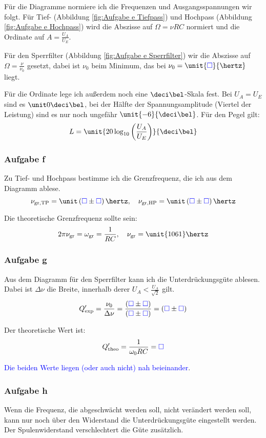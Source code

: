 \documentclass[11pt, ngerman]{article}
\newcommand{\emesswert}{\left(\messwert \pm \messwert \right)}
\newcommand{\messwert}{\textcolor{blue}{\square}}
\begin{document}
Für die Diagramme normiere ich die Frequenzen und Ausgangsspannungen wir folgt.
Für Tief- (Abbildung \ref{fig:Aufgabe e Tiefpass}) und Hochpass (Abbildung
\ref{fig:Aufgabe e Hochpass}) wird die Abszisse auf $\Omega = \nu R C$ normiert
und die Ordinate auf $A = \frac{U_A}{U_E}$.

Für den Sperrfilter (Abbildung \ref{fig:Aufgabe e Sperrfilter}) wir die
Abszisse auf $\Omega = \frac{\nu}{\nu_0}$ gesetzt, dabei ist $\nu_0$ beim
Minimum, das bei $\nu_0 = \unit{\messwert}{\hertz}$ liegt.

Für die Ordinate lege ich außerdem noch eine $\deci\bel$-Skala fest. Bei $U_A =
U_E$ sind es $\unit0{\deci\bel}$, bei der Hälfte der Spannungsamplitude
(Viertel der Leistung) sind es nur noch ungefähr $\unit{-6}{\deci\bel}$. Für
den Pegel gilt:
\[ L = \unit{20 \log_{10} \del{\frac{U_A}{U_E}}}{\deci\bel} \]

\subsubsection{Aufgabe f}

Zu Tief- und Hochpass bestimme ich die Grenzfrequenz, die ich aus dem Diagramm
ablese.
\[
	\nu_{\text{gr},\text{TP}} = \unit\emesswert\hertz
	, \quad
	\nu_{\text{gr},\text{HP}} = \unit\emesswert\hertz
\]

Die theoretische Grenzfrequenz sollte sein:
\[
	2 \pi \nu_\text{gr} = \omega_\text{gr} = \frac1{RC}
	, \quad
	\nu_\text{gr} = \unit{1061}\hertz
\]

\subsubsection{Aufgabe g}

Aus dem Diagramm für den Sperrfilter kann ich die Unterdrückungsgüte ablesen.
Dabei ist $\Delta \nu$ die Breite, innerhalb derer $U_A < \frac{U_A}{\sqrt{2}}$
gilt.
\[
	Q'_\text{exp} = \frac{\nu_0}{\Delta \nu} = \frac{\emesswert}{\emesswert} = \emesswert
\]

Der theoretische Wert ist:
\[
	Q'_\text{theo} = \frac{1}{\omega_0 R C} = \messwert
\]

\textcolor{blue}{Die beiden Werte liegen (oder auch nicht) nah beieinander}.

\subsubsection{Aufgabe h}

Wenn die Frequenz, die abgeschwächt werden soll, nicht verändert werden soll,
kann nur noch über den Widerstand die Unterdrückungsgüte eingestellt werden.
Der Spulenwiderstand verschlechtert die Güte zusätzlich.
\end{document}
